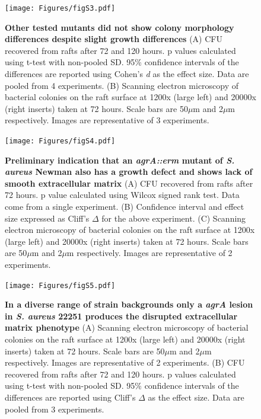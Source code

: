 \documentclass[10pt,letterpaper]{article}
\begin{document}
\begin{figure}[H]
\begin{adjustwidth}{-2.25in}{0in}
\texttt{[image: Figures/figS3.pdf]}
\caption[Other tested mutants did not show colony morphology differences despite slight growth differences]{
	\textbf{Other tested mutants did not show colony morphology differences despite slight growth differences}
	(A) CFU recovered from rafts after 72 and 120 hours. p values calculated using t-test with non-pooled SD. 95\% confidence intervals of the differences are reported using Cohen's \textit{d} as the effect size. Data are pooled from 4 experiments.
	(B) Scanning electron microscopy of bacterial colonies on the raft surface at 1200x (large left) and 20000x (right inserts) taken at 72 hours. Scale bars are 50$\mu$m and 2$\mu$m respectively. Images are representative of 3 experiments.}
        \label{figS3}
        \end{adjustwidth}
\end{figure}

\begin{figure}[H]
\begin{adjustwidth}{-2.25in}{0in}
\texttt{[image: Figures/figS4.pdf]}
\caption[Preliminary indication that an \textit{agrA::erm} mutant of \textit{S. aureus} Newman also has a growth defect and shows lack of smooth extracellular matrix]{
\textbf{Preliminary indication that an \textit{agrA::erm} mutant of \textit{S. aureus} Newman also has a growth defect and shows lack of smooth extracellular matrix}
	(A) CFU recovered from rafts after 72 hours. p value calculated using Wilcox signed rank test. Data come from a single experiment.
	(B) Confidence interval and effect size expressed as Cliff's $\Delta$ for the above experiment.
	(C) Scanning electron microscopy of bacterial colonies on the raft surface at 1200x (large left) and 20000x (right inserts) taken at 72 hours. Scale bars are 50$\mu$m and 2$\mu$m respectively. Images are representative of 2 experiments.}
        \label{figS4}
        \end{adjustwidth}
\end{figure}

\begin{figure}[H]
\begin{adjustwidth}{-2.25in}{0in}
\texttt{[image: Figures/figS5.pdf]}
\caption[In a diverse range of strain backgrounds only a \textit{agrA} lesion in \textit{S. aureus} 22251 produces the disrupted extracellular matrix phenotype]{
	\textbf{In a diverse range of strain backgrounds only a \textit{agrA} lesion in \textit{S. aureus} 22251 produces the disrupted extracellular matrix phenotype}
	(A) Scanning electron microscopy of bacterial colonies on the raft surface at 1200x (large left) and 20000x (right inserts) taken at 72 hours. Scale bars are 50$\mu$m and 2$\mu$m respectively. Images are representative of 2 experiments.
	(B) CFU recovered from rafts after 72 and 120 hours. p values calculated using t-test with non-pooled SD. 95\% confidence intervals of the differences are reported using Cliff's $\Delta$ as the effect size. Data are pooled from 3 experiments.}
        \label{figS5}
        \end{adjustwidth}
\end{figure}
\end{document}
